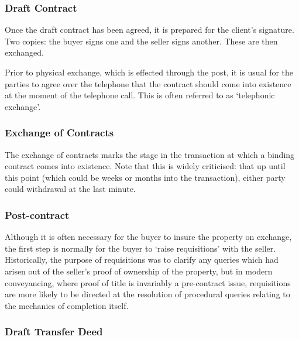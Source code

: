 \documentclass[
]{article}
\newenvironment{Shaded}{}{}
\newcommand{\NormalTok}[1]{#1}
\begin{document}
\hypertarget{draft-contract}{%
\subsubsection{Draft Contract}\label{draft-contract}}

Once the draft contract has been agreed, it is prepared for the client's
signature. Two copies: the buyer signs one and the seller signs another.
These are then exchanged.

\begin{Shaded}
\begin{Highlighting}[]
\NormalTok{Prior to physical exchange, which is effected through the post, it is usual for the parties to agree over the telephone that the contract should come into existence at the moment of the  telephone call. This is often referred to as ‘telephonic exchange’.}
\end{Highlighting}
\end{Shaded}

\hypertarget{exchange-of-contracts}{%
\subsubsection{Exchange of Contracts}\label{exchange-of-contracts}}

The exchange of contracts marks the stage in the transaction at which a
binding contract comes into existence. Note that this is widely
criticised: that up until this point (which could be weeks or months
into the transaction), either party could withdrawal at the last minute.

\hypertarget{post-contract}{%
\subsubsection{Post-contract}\label{post-contract}}

Although it is often necessary for the buyer to insure the property on
exchange, the first step is normally for the buyer to `raise
requisitions' with the seller. Historically, the purpose of requisitions
was to clarify any queries which had arisen out of the seller's proof of
ownership of the property, but in modern conveyancing, where proof of
title is invariably a pre-contract issue, requisitions are more likely
to be directed at the resolution of procedural queries relating to the
mechanics of completion itself.

\hypertarget{draft-transfer-deed}{%
\subsubsection{Draft Transfer Deed}\label{draft-transfer-deed}}
\end{document}

